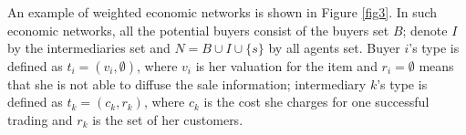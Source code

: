 \documentclass{article}
\begin{document}
An example of weighted economic networks is shown in Figure \ref{fig3}. In such economic networks, all the potential buyers consist of the buyers set $B$; denote $I$ by the intermediaries set and $N=B\cup I\cup \{s\}$ by all agents set. Buyer $i$'s type is defined as $t_i=(v_i,\emptyset)$, where $v_i$ is her valuation for the item and $r_i=\emptyset$ means that she is not able to diffuse the sale information; intermediary $k$'s type is defined as $t_k=(c_k,r_k)$, where $c_k$ is the cost she charges for one successful trading and $r_k$ is the set of her customers.
\end{document}
